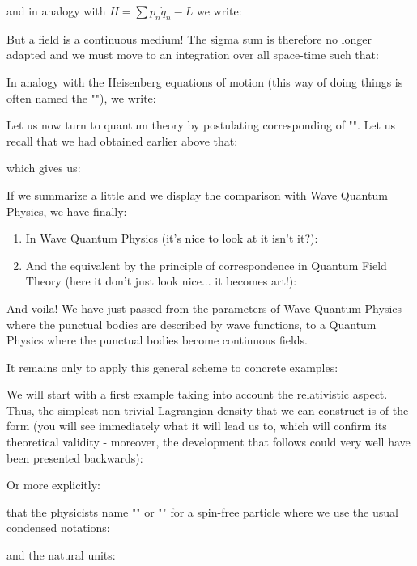 	and in analogy with $H=\displaystyle\sum p_n\dot{q}_n-L$ we write:
	
	But a field is a continuous medium! The sigma sum  is therefore no longer adapted and we must move to an integration over all space-time such that:
	
	In analogy with the Heisenberg equations of motion (this way of doing things is often named the ""), we write:
	
	Let us now turn to quantum theory by postulating corresponding of "". Let us recall that we had obtained earlier above that:
	
	which gives us:
	
	If we summarize a little and we display the comparison with Wave Quantum Physics, we have finally:
	\begin{enumerate}
		\item In Wave Quantum Physics (it's nice to look at it isn't it?):
		
		
		\item And the equivalent by the principle of correspondence in Quantum Field Theory (here it don't just look nice... it becomes art!):
		
	\end{enumerate}
	And voila! We have just passed from the parameters of Wave Quantum Physics where the punctual bodies are described by wave functions, to a Quantum Physics where the punctual bodies become continuous fields.

	It remains only to apply this general scheme to concrete examples:

	We will start with a first example taking into account the relativistic aspect. Thus, the simplest non-trivial Lagrangian density that we can construct is of the form (you will see immediately what it will lead us to, which will confirm its theoretical validity - moreover, the development that follows could very well have been presented backwards):
	
	Or more explicitly:
	
	that the physicists name "" or "" for a spin-free particle where we use the usual condensed notations:
	
	and the natural units:
	
